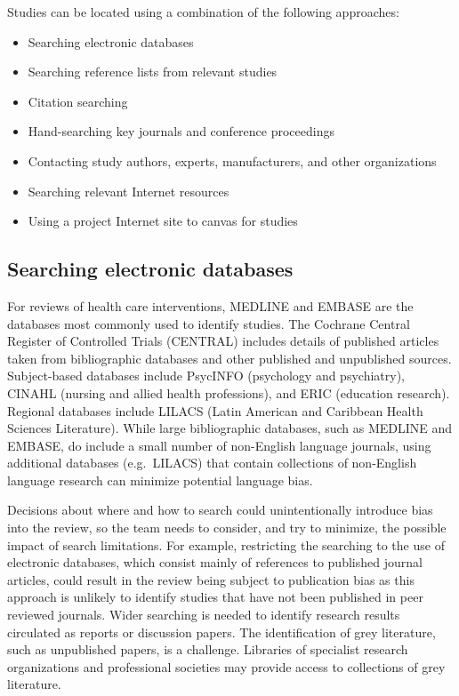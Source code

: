 \documentclass[
  10pt,
  a4paper,
  DIV=11,
  numbers=noendperiod]{scrreprt}
\begin{document}
Studies can be located using a combination of the following approaches:

\begin{itemize}
\item
  Searching electronic databases
\item
  Searching reference lists from relevant studies
\item
  Citation searching
\item
  Hand-searching key journals and conference proceedings
\item
  Contacting study authors, experts, manufacturers, and other
  organizations
\item
  Searching relevant Internet resources
\item
  Using a project Internet site to canvas for studies
\end{itemize}

\subsection{Searching electronic
databases}\label{searching-electronic-databases}

For reviews of health care interventions, MEDLINE and EMBASE are the
databases most commonly used to identify studies. The Cochrane Central
Register of Controlled Trials (CENTRAL) includes details of published
articles taken from bibliographic databases and other published and
unpublished sources. Subject-based databases include PsycINFO
(psychology and psychiatry), CINAHL (nursing and allied health
professions), and ERIC (education research). Regional databases include
LILACS (Latin American and Caribbean Health Sciences Literature). While
large bibliographic databases, such as MEDLINE and EMBASE, do include a
small number of non-English language journals, using additional
databases (e.g.~LILACS) that contain collections of non-English language
research can minimize potential language bias.

Decisions about where and how to search could unintentionally introduce
bias into the review, so the team needs to consider, and try to
minimize, the possible impact of search limitations. For example,
restricting the searching to the use of electronic databases, which
consist mainly of references to published journal articles, could result
in the review being subject to publication bias as this approach is
unlikely to identify studies that have not been published in peer
reviewed journals. Wider searching is needed to identify research
results circulated as reports or discussion papers. The identification
of grey literature, such as unpublished papers, is a challenge.
Libraries of specialist research organizations and professional
societies may provide access to collections of grey literature.
\end{document}
